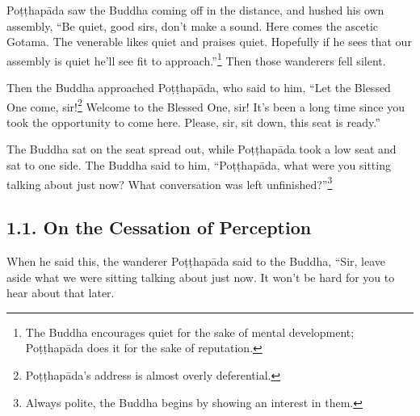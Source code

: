 \documentclass[12pt,openany]{book}%
\begin{document}
\textsanskrit{Poṭṭhapāda} saw the Buddha coming off in the distance, and hushed his own assembly, “Be quiet, good sirs, don’t make a sound. Here comes the ascetic Gotama. The venerable likes quiet and praises quiet. Hopefully if he sees that our assembly is quiet he’ll see fit to approach.”\footnote{The Buddha encourages quiet for the sake of mental development; \textsanskrit{Poṭṭhapāda} does it for the sake of reputation. } Then those wanderers fell silent. 

Then the Buddha approached \textsanskrit{Poṭṭhapāda}, who said to him, “Let the Blessed One come, sir!\footnote{\textsanskrit{Poṭṭhapāda}’s address is almost overly deferential. } Welcome to the Blessed One, sir! It’s been a long time since you took the opportunity to come here. Please, sir, sit down, this seat is ready.” 

The Buddha sat on the seat spread out, while \textsanskrit{Poṭṭhapāda} took a low seat and sat to one side. The Buddha said to him, “\textsanskrit{Poṭṭhapāda}, what were you sitting talking about just now? What conversation was left unfinished?”\footnote{Always polite, the Buddha begins by showing an interest in them. } 

\subsection*{1.1. On the Cessation of Perception }

When he said this, the wanderer \textsanskrit{Poṭṭhapāda} said to the Buddha, “Sir, leave aside what we were sitting talking about just now. It won’t be hard for you to hear about that later. 
\end{document}
